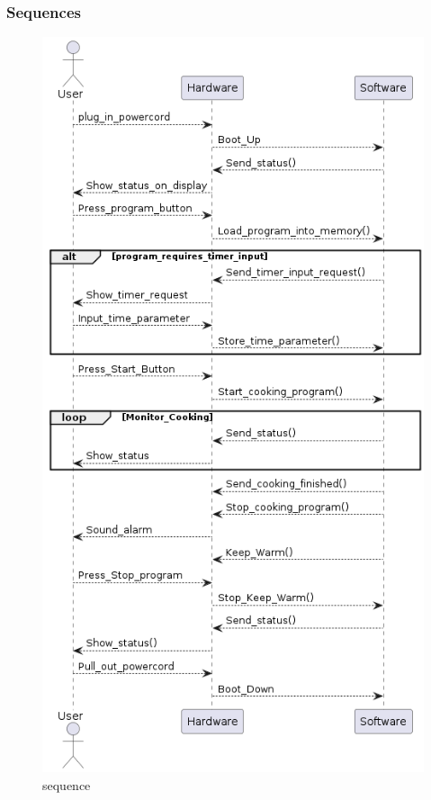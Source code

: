 \documentclass{scrartcl}
\begin{document}
\subsubsection{Sequences}
\begin{figure}[H]\centering
    \includegraphics[width=0.65\columnwidth]{Sequence.png}
    \caption{sequence}\label{fig:4}
\end{figure}
\end{document}
